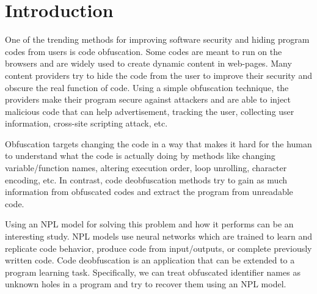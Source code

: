 \documentclass[acmsmall]{acmart}
\begin{document}



\maketitle

\section{Introduction}
One of the trending methods for improving software security and hiding program codes from users is code obfuscation. Some codes are meant to run on the browsers and are widely used to create dynamic content in web-pages. Many content providers try to hide the code from the user to improve their security and obscure the real function of code. Using a simple obfuscation technique, the providers make their program secure against attackers and are able to inject malicious code that can help advertisement, tracking the user, collecting user information, cross-site scripting attack, etc.

Obfuscation targets changing the code in a way that makes it hard for the human to understand what the code is actually doing by methods like changing variable/function names, altering execution order, loop unrolling, character encoding, etc. In contrast, code deobfuscation methods try to gain as much information from obfuscated codes and extract the program from unreadable code.

Using an NPL model for solving this problem and how it performs can be an interesting study. NPL models use neural networks which are trained to learn and replicate code behavior, produce code from input/outputs, or complete previously written code. Code deobfuscation is an application that can be extended to a program learning task. Specifically, we can treat obfuscated identifier names as unknown holes in a program and try to recover them using an NPL model.
\end{document}
